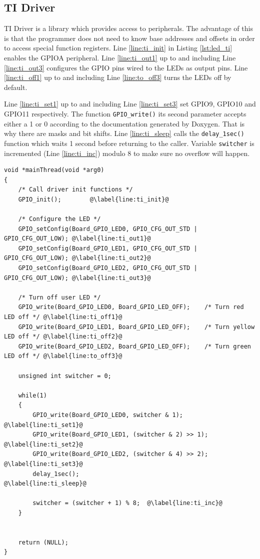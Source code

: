 \newpage
\subsection{TI Driver}

TI Driver is a library which provides access to peripherals.
The advantage of this is that the programmer does not need to know base addresses and offsets in order to access special function registers.
Line \ref{line:ti_init} in Listing \ref{lst:led_ti} enables the GPIOA peripheral.
Line \ref{line:ti_out1} up to and including Line \ref{line:ti_out3} configures the GPIO pins wired to the LEDs as output pins.
Line \ref{line:ti_off1} up to and including Line \ref{line:to_off3} turns the LEDs off by default.

Line \ref{line:ti_set1} up to and including Line \ref{line:ti_set3} set GPIO9, GPIO10 and GPIO11 respectively.
The function \texttt{GPIO\_write()} its second parameter accepts either a 1 or 0 according to the documentation generated by Doxygen. 
That is why there are masks and bit shifts.
Line \ref{line:ti_sleep} calls the \texttt{delay\_1sec()} function which waits 1 second before returning to the caller.
Variable \texttt{switcher} is incremented (Line \ref{line:ti_inc}) modulo 8 to make sure no overflow will happen. 

\begin{lstlisting}[style=CStyle, caption={Toggling LEDs according to Table \ref{tab:led_scheme} using TI Driver}, captionpos=b, label={lst:led_ti}, escapechar=@]
void *mainThread(void *arg0)
{
    /* Call driver init functions */
    GPIO_init();        @\label{line:ti_init}@
 
    /* Configure the LED */
    GPIO_setConfig(Board_GPIO_LED0, GPIO_CFG_OUT_STD | GPIO_CFG_OUT_LOW); @\label{line:ti_out1}@
    GPIO_setConfig(Board_GPIO_LED1, GPIO_CFG_OUT_STD | GPIO_CFG_OUT_LOW); @\label{line:ti_out2}@  
    GPIO_setConfig(Board_GPIO_LED2, GPIO_CFG_OUT_STD | GPIO_CFG_OUT_LOW); @\label{line:ti_out3}@
 
    /* Turn off user LED */
    GPIO_write(Board_GPIO_LED0, Board_GPIO_LED_OFF);    /* Turn red LED off */ @\label{line:ti_off1}@
    GPIO_write(Board_GPIO_LED1, Board_GPIO_LED_OFF);    /* Turn yellow LED off */ @\label{line:ti_off2}@
    GPIO_write(Board_GPIO_LED2, Board_GPIO_LED_OFF);    /* Turn green LED off */ @\label{line:to_off3}@
 
    unsigned int switcher = 0;
 
    while(1)
    {
        GPIO_write(Board_GPIO_LED0, switcher & 1);      @\label{line:ti_set1}@
        GPIO_write(Board_GPIO_LED1, (switcher & 2) >> 1);   @\label{line:ti_set2}@
        GPIO_write(Board_GPIO_LED2, (switcher & 4) >> 2);   @\label{line:ti_set3}@
        delay_1sec();                                   @\label{line:ti_sleep}@
 
        switcher = (switcher + 1) % 8;  @\label{line:ti_inc}@
    }
 
 
    return (NULL);
}
\end{lstlisting}


